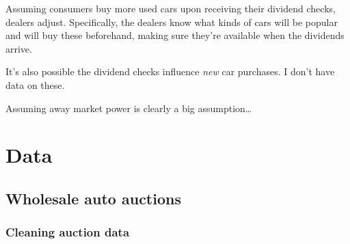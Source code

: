 \documentclass[11pt,letterpaper,oneside]{article}
\newcommand{\snippet}[1]{\hspace{-0.15em}}
\begin{document}
Assuming consumers buy more used cars upon receiving their dividend checks, dealers adjust.
Specifically, the dealers know what kinds of cars will be popular and will buy these beforehand, making sure they're available when the dividends arrive.

It's also possible the dividend checks influence \emph{new} car purchases.
I don't have data on these.

Assuming away market power is clearly a big assumption\ldots


\section{Data}

\subsection{Wholesale auto auctions}
\label{sec:manheim-data}


\snippet{clean_car_auctions_resold.tex}
\subsubsection{Cleaning auction data}
\label{sec:manheim-data-cleaning}
\end{document}
